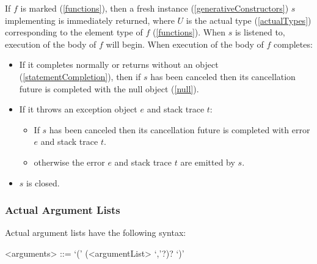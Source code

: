 \documentclass[makeidx]{article}
\begin{document}
{

\LMHash{}%
If $f$ is marked \code{\ASYNC*} (\ref{functions}),
then a fresh instance (\ref{generativeConstructors}) $s$
implementing  is immediately returned,
where $U$ is the actual type
(\ref{actualTypes})
corresponding to the element type of $f$
(\ref{functions}).
When $s$ is listened to, execution of the body of $f$ will begin.
When execution of the body of $f$ completes:
\begin{itemize}
\item If it completes normally or returns without an object
  (\ref{statementCompletion}),
  then if $s$ has been canceled
  then its cancellation future is completed with the null object (\ref{null}).
\item If it throws an exception object $e$ and stack trace $t$:
  \begin{itemize}
  \item If $s$ has been canceled then its cancellation future is completed
    with error $e$ and stack trace $t$.
  \item otherwise the error $e$ and stack trace $t$ are emitted by $s$.
  \end{itemize}
\item $s$ is closed.
\end{itemize}



\subsubsection{Actual Argument Lists}

\LMHash{}%
Actual argument lists have the following syntax:

\begin{grammar}
<arguments> ::= `(' (<argumentList> `,'?)? `)'


\end{grammar}}
\end{document}
